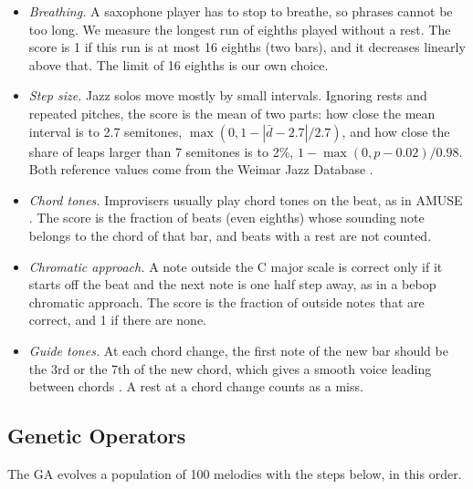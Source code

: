 \begin{itemize}
  \item \emph{Breathing.} A saxophone player has to stop to breathe, so phrases cannot be too long. We measure the longest run of eighths played without a rest. The score is 1 if this run is at most 16 eighths (two bars), and it decreases linearly above that. The limit of 16 eighths is our own choice.
  \item \emph{Step size.} Jazz solos move mostly by small intervals. Ignoring rests and repeated pitches, the score is the mean of two parts: how close the mean interval is to 2.7 semitones, $\max(0, 1 - |\bar{d} - 2.7| / 2.7)$, and how close the share of leaps larger than 7 semitones is to 2\%, $1 - \max(0, p - 0.02) / 0.98$. Both reference values come from the Weimar Jazz Database \cite{pfleiderer2017}.
  \item \emph{Chord tones.} Improvisers usually play chord tones on the beat, as in AMUSE \cite{ozcan2008}. The score is the fraction of beats (even eighths) whose sounding note belongs to the chord of that bar, and beats with a rest are not counted.
  \item \emph{Chromatic approach.} A note outside the C major scale is correct only if it starts off the beat and the next note is one half step away, as in a bebop chromatic approach. The score is the fraction of outside notes that are correct, and 1 if there are none.
  \item \emph{Guide tones.} At each chord change, the first note of the new bar should be the 3rd or the 7th of the new chord, which gives a smooth voice leading between chords \cite{smither2019}. A rest at a chord change counts as a miss.
\end{itemize}

\subsection{Genetic Operators}

The GA evolves a population of 100 melodies with the steps below, in this order.

